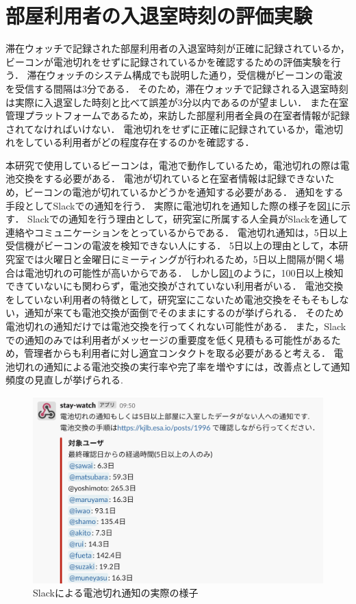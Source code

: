 



\section{部屋利用者の入退室時刻の評価実験}\label{3.3}
滞在ウォッチで記録された部屋利用者の入退室時刻が正確に記録されているか，ビーコンが電池切れをせずに記録されているかを確認するための評価実験を行う．
滞在ウォッチのシステム構成でも説明した通り，受信機がビーコンの電波を受信する間隔は3分である．
そのため，滞在ウォッチで記録される入退室時刻は実際に入退室した時刻と比べて誤差が3分以内であるのが望ましい．
また在室管理プラットフォームであるため，来訪した部屋利用者全員の在室者情報が記録されてなければいけない．
電池切れをせずに正確に記録されているか，電池切れをしている利用者がどの程度存在するのかを確認する．

本研究で使用しているビーコンは，電池で動作しているため，電池切れの際は電池交換をする必要がある．
電池が切れていると在室者情報は記録できないため，ビーコンの電池が切れているかどうかを通知する必要がある．
通知をする手段としてSlackでの通知を行う．
実際に電池切れを通知した際の様子を図\ref{batoff}に示す．
Slackでの通知を行う理由として，研究室に所属する人全員がSlackを通して連絡やコミュニケーションをとっているからである．
電池切れ通知は，5日以上受信機がビーコンの電波を検知できない人にする．
5日以上の理由として，本研究室では火曜日と金曜日にミーティングが行われるため，5日以上間隔が開く場合は電池切れの可能性が高いからである．
しかし図\ref{batoff}のように，100日以上検知できていないにも関わらず，電池交換がされていない利用者がいる．
電池交換をしていない利用者の特徴として，研究室にこないため電池交換をそもそもしない，通知が来ても電池交換が面倒でそのままにするのが挙げられる．
そのため電池切れの通知だけでは電池交換を行ってくれない可能性がある．
また，Slackでの通知のみでは利用者がメッセージの重要度を低く見積もる可能性があるため，管理者からも利用者に対し適宜コンタクトを取る必要があると考える．
電池切れの通知による電池交換の実行率や完了率を増やすには，改善点として通知頻度の見直しが挙げられる.

\begin{figure}[H]
  \begin{center}
    \includegraphics[width=160mm]{image/batoff.png}
    \caption{Slackによる電池切れ通知の実際の様子}
    \label{batoff}
  \end{center}
\end{figure}

